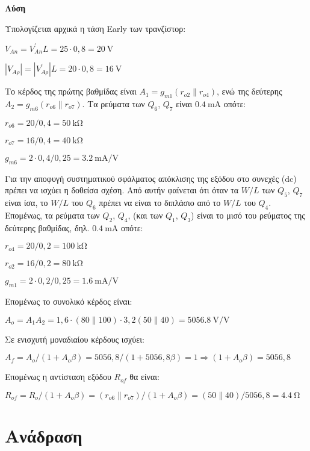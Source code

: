 \documentclass[11pt,a4paper,titlepage,fleqn]{article}
\begin{document}
	\textbf{Λύση}
	
	Υπολογίζεται αρχικά  η τάση Early των τρανζίστορ:
	
	$V_{An} = V^{'}_{An} L = 25\cdot0,8 = \SI{20}{\volt}$
	
	$\left| V_{A\rho}  \right| = \left| V^{'}_{A\rho}  \right| L =20\cdot0,8 = \SI{16}{\volt}$
	
	Το κέρδος της πρώτης βαθμίδας είναι $A_1=g_{m1} (r_{o2}\|r_{o4})$, ενώ της δεύτερης   $A_2=g_{m6} (r_{o6}\|r_{o7})$.
	Τα ρεύματα των $Q_6$, $Q_7$ είναι $\SI{0,4}{\milli\ampere}$ οπότε:
	
	$r_{o6} = 20 / 0,4 = \SI{50}{\kilo\ohm}$
	
	$r_{o7} = 16 / 0,4 = \SI{40}{\kilo\ohm}$
	
	$g_{m6} = 2 \cdot 0,4 / 0,25 = \SI[per-mode=symbol]{3,2}{\milli\ampere\per\volt}$
	
	Για την αποφυγή συστηματικού σφάλματος απόκλισης της εξόδου στο συνεχές (dc) πρέπει να
	ισχύει η δοθείσα σχέση. Από αυτήν φαίνεται ότι όταν τα $W/L$ των $Q_5$, $Q_7$ είναι ίσα, το $W/L$ του $Q_6$ πρέπει να είναι το διπλάσιο από το $W/L$ του $Q_4$. Επομένως, τα ρεύματα των $Q_2$, $Q_4$, (και των $Q_1$, $Q_3$) είναι το μισό του ρεύματος της δεύτερης βαθμίδας, δηλ. $\SI{0,4}{\milli\ampere}$ οπότε: 
	
	$r_{o4} = 20 / 0,2 = \SI{100}{\kilo\ohm}$
	
	$r_{o2} = 16 / 0,2 = \SI{80}{\kilo\ohm}$
	
	$g_{m1} = 2 \cdot 0,2 / 0,25 = \SI[per-mode=symbol]{1,6}{\milli\ampere\per\volt}$
	
	Επομένως το συνολικό κέρδος είναι:
	
	$A_o=A_1A_2=1,6\cdot\left(80\|100\right) \cdot 3,2 \left(50\|40\right) =  \SI[per-mode=symbol]{5056,8}{\volt\per\volt}$
	
	Σε ενισχυτή μοναδιαίου κέρδους ισχύει:
	
	$A_f=A_o / \left(1+A_o\beta\right) = 5056,8 / \left(1+5056,8 \beta\right) = 1 \Rightarrow \left(1+A_o\beta\right) = 5056,8$
	
	Επομένως η αντίσταση εξόδου $R_{of}$ θα είναι:
	
	$R_{of} = R_o / \left(1+A_o\beta\right) = \left(r_{o6}\|r_{o7}\right) / \left(1+A_o\beta\right) = \left(50\|40\right) / 5056,8 = \SI{4,4}{\ohm}$
	
	
\section{Ανάδραση}
\end{document}
